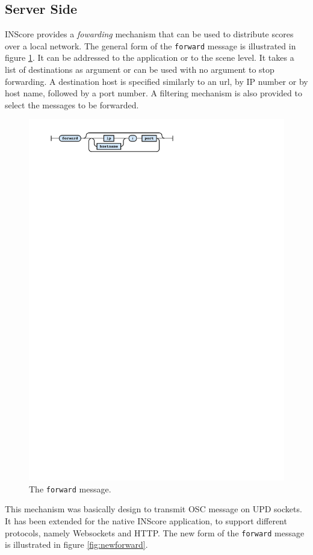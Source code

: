 \documentclass{article}
\newcommand{\icode}[1]	{{\small \texttt{#1}}}
\begin{document}
\subsection{Server Side}\label{sec:server}
INScore provides a \emph{fowarding} mechanism \cite{Fober:15b} that can be used to distribute scores over a local network.
The general form of the \icode{forward} message is illustrated in figure \ref{fig:forward}. It can be addressed to the application or to the scene level. It takes a list of destinations as argument or can be used with no argument to stop forwarding. A destination host is specified similarly to an url, by IP number or by host name, followed by a port number.
A filtering mechanism is also provided to select the messages to be forwarded.
\begin{figure}[h]
\centering
\includegraphics[width=0.75\columnwidth]{rsrc/faust3.pdf}
\caption{The \icode{forward} message.}
\label{fig:forward}
\end{figure}
This mechanism was basically design to transmit OSC message on UPD sockets.
It has been extended for the native INScore application, to support different protocols, namely Websockets and HTTP. The new form of the \icode{forward} message is illustrated in figure \ref{fig:newforward}.
\end{document}
